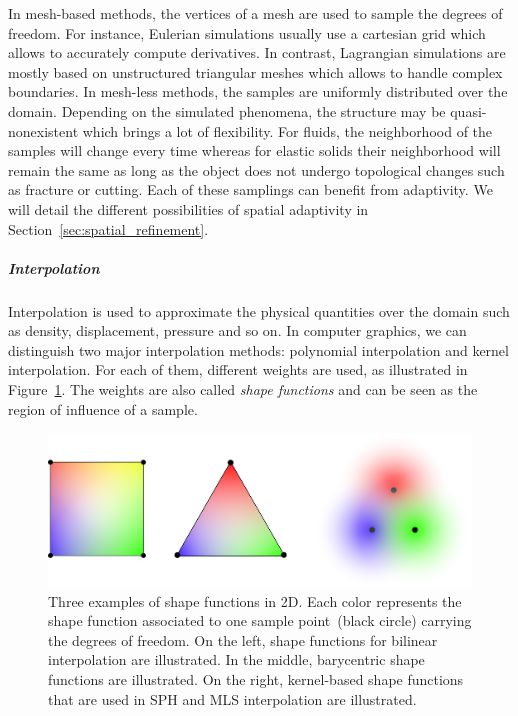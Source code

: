 In mesh-based methods, the vertices of a mesh are used to sample the degrees of freedom. For instance, Eulerian simulations usually use a cartesian grid which allows to accurately compute derivatives. 
In contrast, Lagrangian simulations are mostly based on unstructured triangular meshes which allows to handle complex boundaries.
In mesh-less methods, the samples are uniformly distributed over the domain. Depending on the simulated phenomena, the structure may be quasi-nonexistent which brings a lot of flexibility. For fluids, the neighborhood of the samples will change every time whereas for elastic solids their neighborhood will remain the same as long as the object does not undergo topological changes such as fracture or cutting.
Each of these samplings can benefit from adaptivity. We will detail the different possibilities of spatial adaptivity in Section~\ref{sec:spatial_refinement}.

\subparagraph{Interpolation}
Interpolation is used to approximate the physical quantities over the domain such as density, displacement, pressure and so on. 
In computer graphics, we can distinguish two major interpolation methods: polynomial interpolation and kernel interpolation.
For each of them, different weights are used, as illustrated in Figure~\ref{fig:shapefunction}. The weights are also called \emph{shape functions} and can be seen as the region of influence of a sample.
\begin{figure}[!h]
	\centering
	\includegraphics[width=\linewidth]{images/continuum_mechanics/shapefunction.png}
	\caption[STAR mechanics: Shape functions]{\label{fig:shapefunction} 
		Three examples of shape functions in 2D. 
		Each color represents the shape function associated to one sample point~(black circle) carrying the degrees of freedom. 
		On the left, shape functions for bilinear interpolation are illustrated. 
		In the middle, barycentric shape functions are illustrated. 
		On the right, kernel-based shape functions that are used in SPH and MLS interpolation are illustrated.}
\end{figure}

